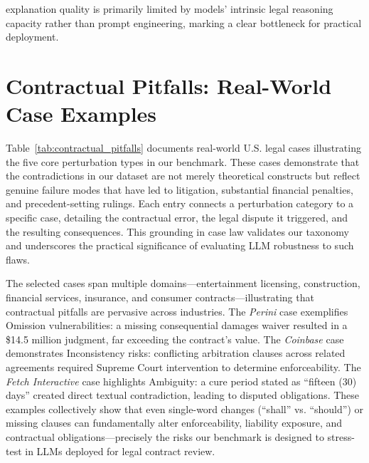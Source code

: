 \documentclass[11pt]{article}
\begin{document}
explanation quality is primarily limited by models' intrinsic legal reasoning capacity rather than prompt engineering, marking a clear bottleneck for practical deployment.

\section{Contractual Pitfalls: Real-World Case Examples}
\label{sec:contractual_pitfalls}

Table~\ref{tab:contractual_pitfalls} documents real-world U.S. legal cases illustrating the five core perturbation types in our benchmark. These cases demonstrate that the contradictions in our dataset are not merely theoretical constructs but reflect genuine failure modes that have led to litigation, substantial financial penalties, and precedent-setting rulings. Each entry connects a perturbation category to a specific case, detailing the contractual error, the legal dispute it triggered, and the resulting consequences. This grounding in case law validates our taxonomy and underscores the practical significance of evaluating LLM robustness to such flaws.

The selected cases span multiple domains—entertainment licensing, construction, financial services, insurance, and consumer contracts—illustrating that contractual pitfalls are pervasive across industries. The \textit{Perini} case exemplifies Omission vulnerabilities: a missing consequential damages waiver resulted in a \$14.5 million judgment, far exceeding the contract's value. The \textit{Coinbase} case demonstrates Inconsistency risks: conflicting arbitration clauses across related agreements required Supreme Court intervention to determine enforceability. The \textit{Fetch Interactive} case highlights Ambiguity: a cure period stated as ``fifteen (30) days'' created direct textual contradiction, leading to disputed obligations. These examples collectively show that even single-word changes (``shall'' vs. ``should'') or missing clauses can fundamentally alter enforceability, liability exposure, and contractual obligations—precisely the risks our benchmark is designed to stress-test in LLMs deployed for legal contract review.
\end{document}
